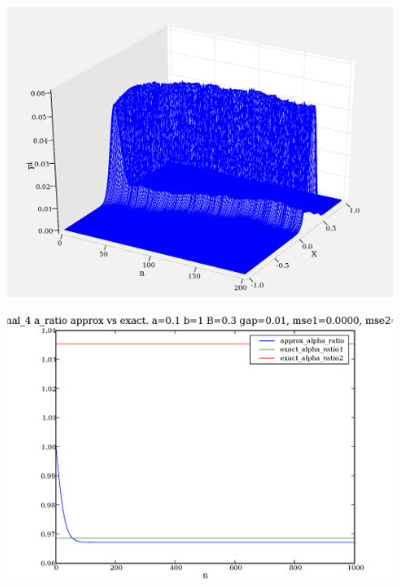 \documentclass[a4paper,10pt]{article}
\begin{document}
\begin{figure}
\includegraphics[width=1\textwidth]{Final_3_corrected_3d_pi_FDF.eps}
\caption{}\label{f8}
\end{figure}

\begin{figure}
\includegraphics[width=1\textwidth]{Final_4_alpha_ratio_comp_a_0.1_b_1_B_0.3_gap_0.01.eps}
\caption{}\label{f9}
\end{figure}
\end{document}
